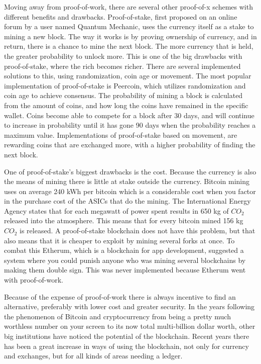 \documentclass[12pt]{article}
\begin{document}
Moving away from proof-of-work, there are several other proof-of-x schemes with different benefits and drawbacks. Proof-of-stake, first proposed on an online forum by a user named Quantum Mechanic, uses the currency itself as a stake to mining a new block. The way it works is by proving ownership of currency, and in return, there is a chance to mine the next block. The more currency that is held, the greater probability to unlock more. This is one of the big drawbacks with proof-of-stake, where the rich becomes richer. There are several implemented solutions to this, using randomization, coin age or movement. The most popular implementation of proof-of-stake is Peercoin, which utilizes randomization and coin age to achieve consensus. The probability of mining a block is calculated from the amount of coins, and how long the coins have remained in the specific wallet. Coins become able to compete for a block after 30 days, and will continue to increase in probability until it has gone 90 days when the probability reaches a maximum value. Implementations of proof-of-stake based on movement, are rewarding coins that are exchanged more, with a higher probability of finding the next block. 

One of proof-of-stake's biggest drawbacks is the cost. Because the currency is also the means of mining there is little at stake outside the currency. Bitcoin mining uses on average 240 kWh per bitcoin which is a considerable cost when you factor in the purchase cost of the ASICs that do the mining. The International Energy Agency states that for each megawatt of power spent results in 650 kg of $CO_2$ released into the atmosphere. This means that for every bitcoin mined 156 kg $CO_2$ is released. A proof-of-stake blockchain does not have this problem, but that also means that it is cheaper to exploit by mining several forks at once. To combat this Etherum, which is a blockchain for app development, suggested a system where you could punish anyone who was mining several blockchains by making them double sign. This was never implemented because Etherum went with proof-of-work. 

Because of the expense of proof-of-work there is always incentive to find an alternative, preferably with lower cost and greater security. In the years following the phenomenon of Bitcoin and cryptocurrency from being a pretty much worthless number on your screen to its now total multi-billion dollar worth, other big institutions have noticed the potential of the blockchain. Recent years there has been a great increase in ways of using the blockchain, not only for currency and exchanges, but for all kinds of areas needing a ledger.
\end{document}
